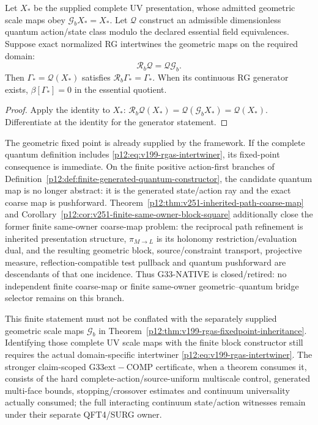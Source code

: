 \documentclass[12pt,a4paper]{article}
\begin{document}
\begin{theorem}
\label{p12:thm:v199-rgas-fixedpoint-inheritance}
Let \(X_*\) be the supplied complete UV presentation, whose admitted
geometric scale maps obey \(\mathcal G_bX_*=X_*\).
Let \(\mathcal Q\) construct an admissible dimensionless quantum
action/state class modulo the declared essential field equivalences.
Suppose exact normalized RG intertwines the geometric maps on the
required domain:
\begin{equation}
\label{p12:eq:v199-rgas-intertwiner}
 \mathcal R_b\mathcal Q=\mathcal Q\mathcal G_b .
\end{equation}
Then \(\Gamma_*=\mathcal Q(X_*)\) satisfies
\(\mathcal R_b\Gamma_*=\Gamma_*\).  When its continuous RG generator
exists, \(\beta[\Gamma_*]=0\) in the essential quotient.
\end{theorem}
\begin{proof}
Apply the identity to \(X_*\):
\(\mathcal R_b\mathcal Q(X_*)=\mathcal Q(\mathcal G_bX_*)=\mathcal Q(X_*)\).
Differentiate at the identity for the generator statement.
\end{proof}
The geometric fixed point is already supplied by the framework.
If the complete quantum definition includes
\eqref{p12:eq:v199-rgas-intertwiner}, its fixed-point consequence is
immediate.  On the finite positive action-first branches of
Definition~\ref{p12:def:finite-generated-quantum-constructor}, the candidate
quantum map is no longer abstract: it is the generated state/action ray and
the exact coarse map is pushforward.  Theorem~\ref{p12:thm:v251-inherited-path-coarse-map}
and Corollary~\ref{p12:cor:v251-finite-same-owner-block-square} additionally
close the former finite same-owner coarse-map problem: the reciprocal path
refinement is inherited presentation structure, $\pi_{M\to L}$ is its
holonomy restriction/evaluation dual, and the resulting geometric block,
source/constraint transport, projective measure, reflection-compatible test
pullback and quantum pushforward are descendants of that one incidence.
Thus G33-NATIVE is closed/retired: no independent finite coarse-map or finite same-owner geometric--quantum bridge selector remains on this branch.

This finite statement must not be conflated with the separately supplied
geometric scale maps $\mathcal G_b$ in
Theorem~\ref{p12:thm:v199-rgas-fixedpoint-inheritance}.  Identifying those
complete UV scale maps with the finite block constructor still requires the
actual domain-specific intertwiner
\eqref{p12:eq:v199-rgas-intertwiner}.  The stronger claim-scoped \(\mathrm{G33	ext{-}COMP}\) certificate, when a theorem consumes it, consists of the hard complete-action/source-uniform multiscale control, generated multi-face bounds, stopping/crossover estimates and continuum universality actually consumed; the full interacting continuum state/action witnesses remain under
their separate QFT4/SURG owner.
\end{document}
